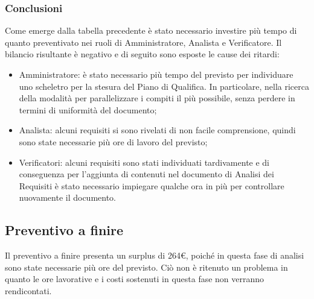 \subsubsection{Conclusioni}
Come emerge dalla tabella precedente è stato necessario investire più tempo di quanto preventivato
nei ruoli di Amministratore, Analista e Verificatore.
Il bilancio risultante è negativo e di seguito sono esposte le cause dei ritardi:
\begin{itemize}
	\item Amministratore: è stato necessario più tempo del previsto per individuare uno scheletro per la stesura del Piano di Qualifica. In particolare,
	nella ricerca della modalità per parallelizzare i compiti il più possibile, senza perdere in termini di uniformità del documento;
	\item Analista: alcuni requisiti si sono rivelati di non facile comprensione, quindi sono state necessarie 
	più ore di lavoro del previsto;
	\item Verificatori: alcuni requisiti sono stati individuati tardivamente e di conseguenza per
	l’aggiunta di contenuti nel documento di Analisi dei Requisiti è stato necessario impiegare
	qualche ora in più per controllare nuovamente il documento.
\end{itemize}
\subsection{Preventivo a finire}
Il preventivo a finire presenta un surplus di 264\euro, poiché in questa fase di analisi sono state necessarie più ore del previsto.
Ciò non è ritenuto un problema in quanto le ore lavorative e i costi sostenuti in questa fase non verranno rendicontati.